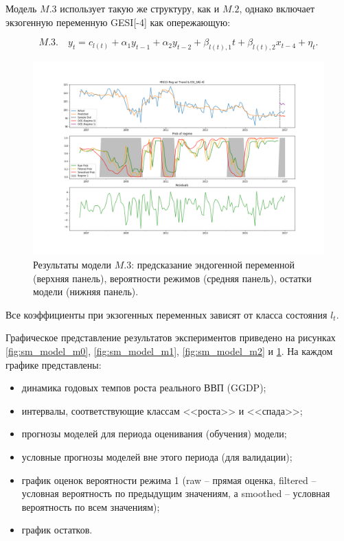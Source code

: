 \documentclass[a4paper,14pt]{extreport}
\begin{document}
Модель $M.3$ использует такую же структуру, как и $M.2$, однако включает экзогенную переменную GESI[-4] как опережающую:

\begin{equation}
	M.3. \quad y_t = c_{l(t)} + \alpha_1 y_{t-1} + \alpha_2 y_{t-2} + \beta_{l(t), 1} t + \beta_{l(t), 2} x_{t-4} + \eta_t .
	\label{eq:ms_arx_m3}
\end{equation}

\begin{figure}[H]
	\includegraphics[width=\linewidth]{img/manual/model_m3.png}
	\caption{
		Результаты модели $M.3$: предсказание эндогенной переменной (верхняя панель), вероятности режимов (средняя панель), остатки модели (нижняя панель).
	}
	\label{fig:sm_model_m3}
\end{figure}

Все коэффициенты при экзогенных переменных зависят от класса состояния $l_t$.

Графическое представление результатов экспериментов приведено на рисунках \ref{fig:sm_model_m0}, \ref{fig:sm_model_m1}, \ref{fig:sm_model_m2} и \ref{fig:sm_model_m3}. На каждом графике представлены:
\begin{itemize}
	\item динамика годовых темпов роста реального ВВП (GGDP);
	\item интервалы, соответствующие классам <<роста>> и <<спада>>;
	\item прогнозы моделей для периода оценивания (обучения) модели;
	\item условные прогнозы моделей вне этого периода (для валидации);
	\item график оценок вероятности режима 1 (raw -- прямая оценка, filtered -- условная вероятность по предыдущим значениям, а smoothed -- условная вероятность по всем значениям);
	\item график остатков.
\end{itemize}
\end{document}
